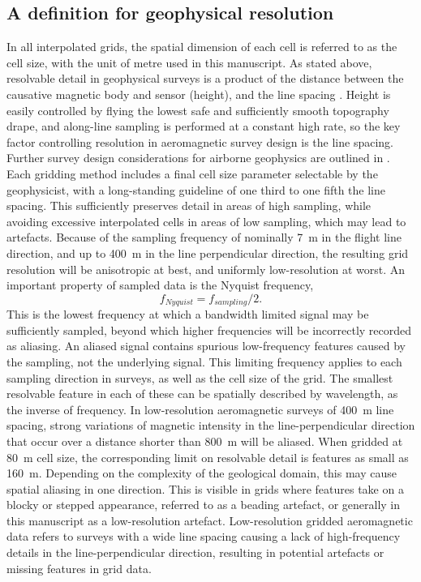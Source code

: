 \documentclass[manuscript.tex]{subfiles}
\begin{document}
\subsection{A definition for geophysical resolution}
In all interpolated grids, the spatial dimension of each cell is referred to as the cell size, with the unit of metre used in this manuscript.
As stated above, resolvable detail in geophysical surveys is a product of the distance between the causative magnetic body and sensor (height), and the line spacing \parencite{islesRelationshipsGeologicalResolution1992,islesGeologicalInterpretationAeromagnetic2018,dentithGeophysicsMineralExploration2014}.
Height is easily controlled by flying the lowest safe and sufficiently smooth topography drape, and along-line sampling is performed at a constant high rate, so the key factor controlling resolution in aeromagnetic survey design is the line spacing.
Further survey design considerations for airborne geophysics are outlined in \textcite{goodwinAirborneMagneticRadiometric2023,islesGeologicalInterpretationAeromagnetic2018,reidAeromagneticSurveyDesign1980}.
Each gridding method includes a final cell size parameter selectable by the geophysicist, with a long-standing guideline of one third to one fifth the line spacing.
This sufficiently preserves detail in areas of high sampling, while avoiding excessive interpolated cells in areas of low sampling, which may lead to artefacts.
Because of the sampling frequency of nominally \qty{7}{\m} in the flight line direction, and  up to \qty{400}{\m} in the line perpendicular direction, the resulting grid resolution will be anisotropic at best, and uniformly low-resolution at worst.
An important property of sampled data is the Nyquist frequency, \[f_{Nyquist} = f_{sampling} / 2.\]
This is the lowest frequency at which a bandwidth limited signal may be sufficiently sampled, beyond which higher frequencies will be incorrectly recorded as aliasing.
An aliased signal contains spurious low-frequency features caused by the sampling, not the underlying signal.
This limiting frequency applies to each sampling direction in surveys, as well as the cell size of the grid.
The smallest resolvable feature in each of these can be spatially described by wavelength, as the inverse of frequency.
In low-resolution aeromagnetic surveys of \qty{400}{\m} line spacing, strong variations of magnetic intensity in the line-perpendicular direction  that occur over a distance shorter than \qty{800}{\m} will be aliased.
When gridded at \qty{80}{\m} cell size, the corresponding limit on resolvable detail is features as small as \qty{160}{\m}.
Depending on the complexity of the geological domain, this may cause spatial aliasing in one direction.
This is visible in grids where features take on a blocky or stepped appearance, referred to as a beading artefact, or generally in this manuscript as a low-resolution artefact.
Low-resolution gridded aeromagnetic data refers to surveys with a wide line spacing causing a lack of high-frequency details in the line-perpendicular direction, resulting in potential artefacts or missing features in grid data.
\end{document}
